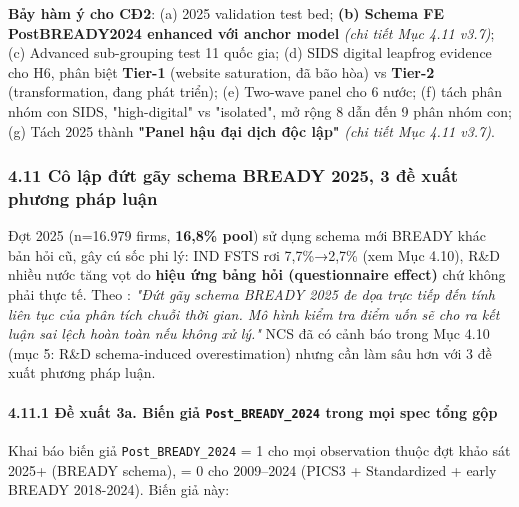 \documentclass[12pt,a4paper]{article}
\begin{document}
\textbf{Bảy hàm ý cho CĐ2}: (a) 2025 validation test bed; \textbf{(b)
Schema FE PostBREADY2024 enhanced với anchor model} \emph{(chi tiết Mục
4.11 v3.7)}; (c) Advanced sub-grouping test 11 quốc gia; (d) SIDS
digital leapfrog evidence cho H6, phân biệt \textbf{Tier-1} (website
saturation, đã bão hòa) vs \textbf{Tier-2} (transformation, đang phát
triển); (e) Two-wave panel cho 6 nước; (f) tách phân nhóm con SIDS,
"high-digital" vs "isolated", mở rộng 8 dẫn đến 9 phân nhóm con; (g)
Tách 2025 thành \textbf{"Panel hậu đại dịch độc lập"} \emph{(chi tiết
Mục 4.11 v3.7)}.

\hypertarget{411-cuxf4-lux1eadp-ux111ux1ee9t-guxe3y-schema-bready-2025-3-ux111ux1ec1-xuux1ea5t-phux1b0ux1a1ng-phuxe1p-luux1eadn}{%
\subsubsection{4.11 Cô lập đứt gãy schema BREADY 2025, 3 đề xuất phương
pháp
luận}\label{411-cuxf4-lux1eadp-ux111ux1ee9t-guxe3y-schema-bready-2025-3-ux111ux1ec1-xuux1ea5t-phux1b0ux1a1ng-phuxe1p-luux1eadn}}

Đợt 2025 (n=16.979 firms, \textbf{16,8\% pool}) sử dụng schema mới
BREADY khác bản hỏi cũ, gây cú sốc phi lý: IND FSTS rơi 7,7\%→2,7\% (xem
Mục 4.10), R\&D nhiều nước tăng vọt do \textbf{hiệu ứng bảng hỏi
(questionnaire effect)} chứ không phải thực tế. Theo : \emph{"Đứt gãy
schema BREADY 2025 đe dọa trực tiếp đến tính liên tục của phân tích
chuỗi thời gian. Mô hình kiểm tra điểm uốn sẽ cho ra kết luận sai lệch
hoàn toàn nếu không xử lý."} NCS đã có cảnh báo trong Mục 4.10 (mục 5:
R\&D schema-induced overestimation) nhưng cần làm sâu hơn với 3 đề xuất
phương pháp luận.

\hypertarget{4111-ux111ux1ec1-xuux1ea5t-3a-biux1ebfn-giux1ea3-post_bready_2024-trong-mux1ecdi-spec-tux1ed5ng-gux1ed9p}{%
\paragraph{\texorpdfstring{4.11.1 Đề xuất 3a. Biến giả
\texttt{Post\_BREADY\_2024} trong mọi spec tổng
gộp}{4.11.1 Đề xuất 3a. Biến giả Post\_BREADY\_2024 trong mọi spec tổng gộp}}\label{4111-ux111ux1ec1-xuux1ea5t-3a-biux1ebfn-giux1ea3-post_bready_2024-trong-mux1ecdi-spec-tux1ed5ng-gux1ed9p}}

Khai báo biến giả \texttt{Post\_BREADY\_2024} = 1 cho mọi observation
thuộc đợt khảo sát 2025+ (BREADY schema), = 0 cho 2009--2024 (PICS3 +
Standardized + early BREADY 2018-2024). Biến giả này:
\end{document}
